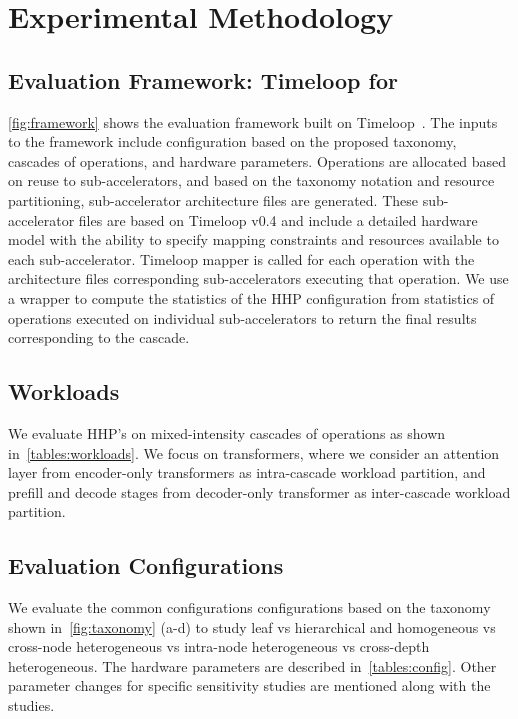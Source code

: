 
\section{Experimental Methodology}

\label{sec:expt}

\subsection{Evaluation Framework: Timeloop for \HHPName}

\autoref{fig:framework} shows the evaluation framework built on Timeloop~\cite{timeloop}. The inputs to the framework include configuration based on the proposed \HHPName taxonomy, cascades of operations, and hardware parameters. Operations are allocated based on reuse to sub-accelerators, and based on the taxonomy notation and resource partitioning, sub-accelerator architecture files are generated. These sub-accelerator files are based on Timeloop v0.4 and include a detailed hardware model with the ability to specify mapping constraints and resources available to each sub-accelerator. Timeloop mapper is called for each operation with the architecture files corresponding sub-accelerators executing that operation. We use a wrapper to compute the statistics of the HHP configuration from statistics of operations executed on individual sub-accelerators to return the final results corresponding to the cascade.

\subsection{Workloads}

We evaluate HHP's on mixed-intensity cascades of operations as shown in~\autoref{tables:workloads}. We focus on transformers, where we consider an attention layer from encoder-only transformers as intra-cascade workload partition, and prefill and decode stages from decoder-only transformer as inter-cascade workload partition. 



\subsection{Evaluation Configurations}

We evaluate the common configurations configurations based on the taxonomy shown in~\autoref{fig:taxonomy} (a-d) to study leaf vs hierarchical and homogeneous vs cross-node heterogeneous vs intra-node heterogeneous vs cross-depth heterogeneous. The hardware parameters are described in~\autoref{tables:config}. Other parameter changes for specific sensitivity studies are mentioned along with the studies.




